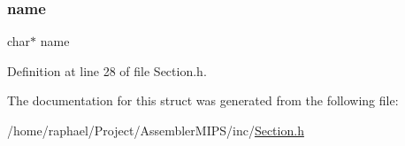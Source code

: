 \subsubsection{\texorpdfstring{name}{name}}
{\footnotesize\ttfamily char$\ast$ name}



Definition at line 28 of file Section.\+h.



The documentation for this struct was generated from the following file\+:\begin{DoxyCompactItemize}
\item 
/home/raphael/\+Project/\+Assembler\+M\+I\+P\+S/inc/\mbox{\hyperlink{_section_8h}{Section.\+h}}\end{DoxyCompactItemize}
